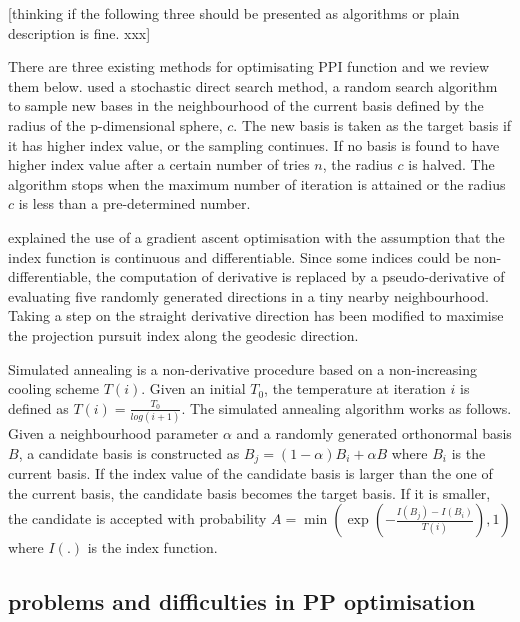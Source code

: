 \documentclass[12pt]{article}
\begin{document}
{[}thinking if the following three should be presented as algorithms or
plain description is fine. xxx{]}

There are three existing methods for optimisating PPI function and we
review them below. \citet{posse1995projection} used a stochastic direct
search method, a random search algorithm to sample new bases in the
neighbourhood of the current basis defined by the radius of the
p-dimensional sphere, \(c\). The new basis is taken as the target basis
if it has higher index value, or the sampling continues. If no basis is
found to have higher index value after a certain number of tries \(n\),
the radius \(c\) is halved. The algorithm stops when the maximum number
of iteration is attained or the radius \(c\) is less than a
pre-determined number.

\citet{cook1995grand} explained the use of a gradient ascent
optimisation with the assumption that the index function is continuous
and differentiable. Since some indices could be non-differentiable, the
computation of derivative is replaced by a pseudo-derivative of
evaluating five randomly generated directions in a tiny nearby
neighbourhood. Taking a step on the straight derivative direction has
been modified to maximise the projection pursuit index along the
geodesic direction.

Simulated annealing
\citep[\citet{kirkpatrick1983optimization}]{bertsimas1993simulated} is a
non-derivative procedure based on a non-increasing cooling scheme
\(T(i)\). Given an initial \(T_0\), the temperature at iteration \(i\)
is defined as \(T(i) = \frac{T_0}{log(i + 1)}\). The simulated annealing
algorithm works as follows. Given a neighbourhood parameter \(\alpha\)
and a randomly generated orthonormal basis \(B\), a candidate basis is
constructed as \(B_j = (1- \alpha)B_i + \alpha B\) where \(B_i\) is the
current basis. If the index value of the candidate basis is larger than
the one of the current basis, the candidate basis becomes the target
basis. If it is smaller, the candidate is accepted with probability
\(A = \min \left(\exp(-\frac{I(B_j) - I(B_i)}{T(i)}), 1 \right)\) where
\(I(.)\) is the index function.

\hypertarget{problems-and-difficulties-in-pp-optimisation}{%
\subsection{problems and difficulties in PP
optimisation}\label{problems-and-difficulties-in-pp-optimisation}}
\end{document}
